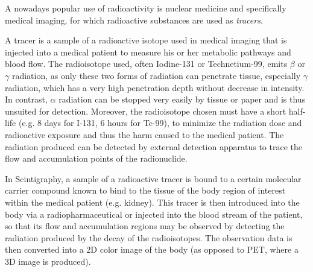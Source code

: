 
A nowadays popular use of radioactivity is nuclear medicine and specifically medical imaging, for which radioactive substances are used as \emph{tracers}.


A tracer is a sample of a radioactive isotope used in medical imaging that is injected into a medical patient to measure his or her metabolic pathways and blood flow. The radioisotope used, often Iodine-131 or Technetium-99, emits $\beta$ or $\gamma$ radiation, as only these two forms of radiation can penetrate tissue, especially $\gamma$ radiation, which has a very high penetration depth without decrease in intensity. In contrast, $\alpha$ radiation can be stopped very easily by tissue or paper and is thus unsuited for detection. Moreover, the radioisotope chosen must have a short half-life (e.g. 8 days for I-131, 6 hours for Tc-99), to minimize the radiation dose and radioactive exposure and thus the harm caused to the medical patient. The radiation produced can be detected by external detection apparatus to trace the flow and accumulation points of the radionuclide.


In Scintigraphy, a sample of a radioactive tracer is bound to a certain molecular carrier compound known to bind to the tissue of the body region of interest within the medical patient (e.g. kidney). This tracer is then introduced into the body via a radiopharmaceutical or injected into the blood stream of the patient, so that its flow and accumulation regions may be observed by detecting the radiation produced by the decay of the radioisotopes. The observation data is then converted into a 2D color image of the body (as opposed to PET, where a 3D image is produced).


